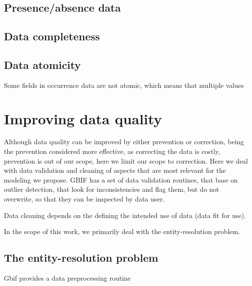 \subsection{Presence/absence data}

\subsection{Data completeness}

\subsection{Data atomicity}
Some fields in occurrence data are not atomic, which means that multiple values


\section{Improving data quality}
Although data quality can be improved by either prevention or correction, being the prevention considered more effective, as correcting the data is costly\cite{Chapman2005}, prevention is out of our scope, here we limit our scope to correction.
Here we deal with data validation and cleaning of aspects that are most relevant for the modeling we propose.
GBIF has a set of data validation routines, that base on outlier detection, that look for inconsistencies and flag them, but do not overwrite, so that they can be inspected by data user.

Data cleaning depends on the defining the intended use of data (data fit for use).

In the scope of this work, we primarily deal with the entity-resolution problem.

\subsection{The entity-resolution problem}


\cite{Bhattacharya2007}

Gbif provides a data preprocessing routine %







